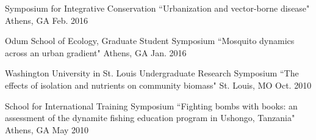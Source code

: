 

\begin{cvsubentries}
  \cvsubentry
    {Symposium for Integrative Conservation} %
    {``Urbanization and vector-borne disease"} %
    {Athens, GA} %
    {Feb. 2016} %
    {
      \begin{cvitems} %
      \end{cvitems}
    }

  \cvsubentry
    {Odum School of Ecology, Graduate Student Symposium} %
    {``Mosquito dynamics across an urban gradient"} %
    {Athens, GA} %
    {Jan. 2016} %
    {
      \begin{cvitems} %
      \end{cvitems}
    }

  \cvsubentry
    {Washington University in St. Louis Undergraduate Research Symposium} %
    {``The effects of isolation and nutrients on community biomass"} %
    {St. Louis, MO} %
    {Oct. 2010} %
    {
      \begin{cvitems} %
      \end{cvitems}
    }

  \cvsubentry
    {School for International Training Symposium} %
    {``Fighting bombs with books: an assessment of the dynamite fishing education program in Ushongo, Tanzania"} %
    {Athens, GA} %
    {May 2010} %
	{
      \begin{cvitems} %
      \end{cvitems}
    }
\end{cvsubentries}
